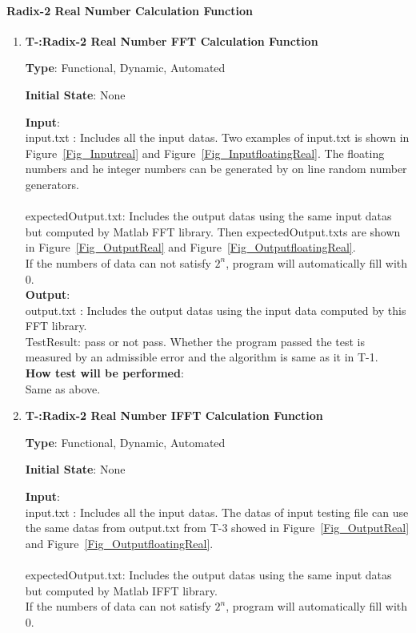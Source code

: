 \documentclass[12pt, titlepage]{article}
\newcounter{tnum}
\begin{document}
\paragraph{Radix-2 Real Number Calculation Function\\}

\begin{enumerate}

\item{\textbf{T-\thetnum \label{R2RFFT}:Radix-2 Real Number FFT Calculation Function}}

\textbf {Type}: Functional, Dynamic, Automated
					
\textbf {Initial State}: None
					
\textbf {Input}:\\{\large input.txt} :  Includes all the input datas. Two examples of input.txt is shown in Figure~\ref{Fig_Inputreal} and Figure~\ref{Fig_InputfloatingReal}. The floating numbers and he integer numbers can be generated by on line random number generators.\\\\
{\large expectedOutput.txt}:  Includes the output datas using the same input datas but computed by Matlab FFT library. Then expectedOutput.txts  are shown in Figure~\ref{Fig_OutputReal} and Figure~\ref{Fig_OutputfloatingReal}. \\ 
If the numbers of data can not satisfy $2^n$, program will automatically fill with 0.\\
					
\textbf {Output}: \\{\large output.txt} : Includes the output datas using the input data computed by this FFT library.\\
{\large TestResult}: pass or not pass. Whether the program passed the test is measured by an admissible error and the algorithm is same as it in T-1.\\
					
\textbf {How test will be performed}: \\
Same as above.

\item{\textbf{T-\thetnum \label{R2RIFFT}:Radix-2 Real Number IFFT Calculation Function}}

\textbf {Type}: Functional, Dynamic, Automated
					
\textbf {Initial State}: None
										
\textbf {Input}:\\{\large input.txt} :  Includes all the input datas. The datas of  input testing file can use the same datas from output.txt from T-3 showed  in Figure~\ref{Fig_OutputReal} and Figure~\ref{Fig_OutputfloatingReal}.\\\\
{\large expectedOutput.txt}:  Includes the output datas using the same input datas but computed by Matlab IFFT library. \\ 
If the numbers of data can not satisfy $2^n$, program will automatically fill with 0.\\
					

\end{enumerate}
\end{document}
